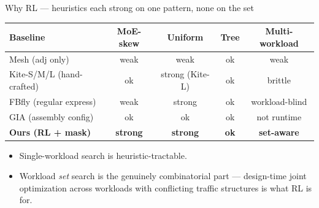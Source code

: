 \documentclass[aspectratio=169]{beamer}
\begin{document}
\begin{frame}{Why RL — heuristics each strong on one pattern, none on the set}
\centering
\scriptsize
\begin{tabular}{lcccc}
\toprule
Baseline & MoE-skew & Uniform & Tree & Multi-workload \\
\midrule
Mesh (adj only)         & \color{ourred}weak     & \color{ourred}weak     & ok   & \color{ourred}weak \\
Kite-S/M/L (hand-crafted) & ok                   & strong (Kite-L)        & ok   & \color{ourred}brittle \\
FBfly (regular express) & weak                   & strong                 & ok   & \color{ourred}workload-blind \\
GIA (assembly config)   & ok                     & ok                     & ok   & \color{ourred}not runtime \\
\midrule
\textbf{Ours (RL + mask)} & \textbf{strong}      & \textbf{strong}        & \textbf{ok} & \textbf{set-aware} \\
\bottomrule
\end{tabular}

\vspace{1em}
\normalsize
\begin{itemize}
  \item Single-workload search is heuristic-tractable.
  \item \alert{Workload \emph{set} search is the genuinely combinatorial part}
        --- design-time joint optimization across workloads with conflicting
        traffic structures is what RL is for.
\end{itemize}
\end{frame}
\end{document}

